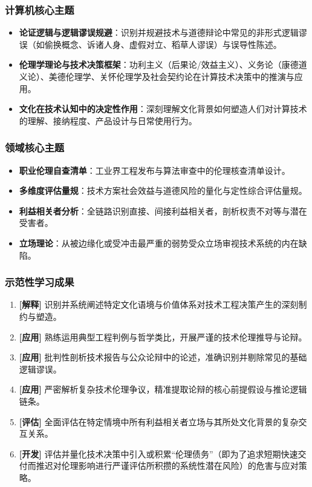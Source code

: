 \subsubsection{计算机核心主题}
\begin{itemize}
    \item \textbf{论证逻辑与逻辑谬误规避}：识别并规避技术与道德辩论中常见的非形式逻辑谬误（如偷换概念、诉诸人身、虚假对立、稻草人谬误）与误导性陈述。
    \item \textbf{伦理学理论与技术决策框架}：功利主义（后果论/效益主义）、义务论（康德道义论）、美德伦理学、关怀伦理学及社会契约论在计算技术决策中的推演与应用。
    \item \textbf{文化在技术认知中的决定性作用}：深刻理解文化背景如何塑造人们对计算技术的理解、接纳程度、产品设计与日常使用行为。
\end{itemize}

\subsubsection{领域核心主题}
\begin{itemize}
    \item \textbf{职业伦理自查清单}：工业界工程发布与算法审查中的伦理核查清单设计。
    \item \textbf{多维度评估量规}：技术方案社会效益与道德风险的量化与定性综合评估量规。
    \item \textbf{利益相关者分析}：全链路识别直接、间接利益相关者，剖析权责不对等与潜在受害者。
    \item \textbf{立场理论}：从被边缘化或受冲击最严重的弱势受众立场审视技术系统的内在缺陷。
\end{itemize}

\subsubsection{示范性学习成果}
\begin{enumerate}
    \item \textbf{[解释]} 识别并系统阐述特定文化语境与价值体系对技术工程决策产生的深刻制约与塑造。
    \item \textbf{[应用]} 熟练运用典型工程判例与哲学类比，开展严谨的技术伦理推导与论辩。
    \item \textbf{[应用]} 批判性剖析技术报告与公众论辩中的论述，准确识别并剔除常见的基础逻辑谬误。
    \item \textbf{[应用]} 严密解析复杂技术伦理争议，精准提取论辩的核心前提假设与推论逻辑链条。
    \item \textbf{[评估]} 全面评估在特定情境中所有利益相关者立场与其所处文化背景的复杂交互关系。
    \item \textbf{[开发]} 评估并量化技术决策中引入或积累“伦理债务”（即为了追求短期快速交付而推迟对伦理影响进行严谨评估所积攒的系统性潜在风险）的危害与应对策略。
\end{enumerate}

